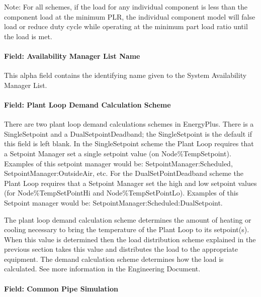 Note: For all schemes, if the load for any individual component is less than the component load at the minimum PLR, the individual component model will false load or reduce duty cycle while operating at the minimum part load ratio until the load is met.

\paragraph{Field: Availability Manager List Name}\label{field-availability-manager-list-name-000}

This alpha field contains the identifying name given to the System Availability Manager List.

\paragraph{Field: Plant Loop Demand Calculation Scheme}\label{field-plant-loop-demand-calculation-scheme}

There are two plant loop demand calculations schemes in EnergyPlus. There is a SingleSetpoint and a DualSetpointDeadband; the SingleSetpoint is the default if this field is left blank. In the SingleSetpoint scheme the Plant Loop requires that a Setpoint Manager set a single setpoint value (on Node\%TempSetpoint). Examples of this setpoint manager would be: SetpointManager:Scheduled, SetpointManager:OutsideAir, etc. For the DualSetPointDeadband scheme the Plant Loop requires that a Setpoint Manager set the high and low setpoint values (for Node\%TempSetPointHi and Node\%TempSetPointLo). Examples of this Setpoint manager would be: SetpointManager:Scheduled:DualSetpoint.

The plant loop demand calculation scheme determines the amount of heating or cooling necessary to bring the temperature of the Plant Loop to its setpoint(s). When this value is determined then the load distribution scheme explained in the previous section takes this value and distributes the load to the appropriate equipment. The demand calculation scheme determines how the load is calculated. See more information in the Engineering Document.

\paragraph{Field: Common Pipe Simulation}\label{field-common-pipe-simulation}

